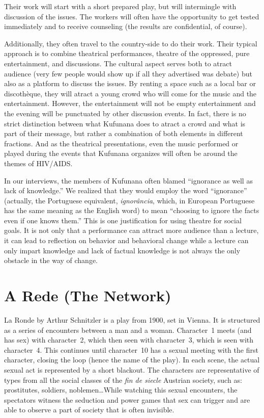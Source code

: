 \documentclass[article,twocolumn]{memoir}
\begin{document}
Their work will start with a short prepared play, but will intermingle with
discussion of the issues. The workers will often have the opportunity to get
tested immediately and to receive counseling (the results are confidential, of
course).

Additionally, they often travel to the country-side to do their work. Their
typical approach is to combine theatrical performances, theatre of the
oppressed, pure entertainment, and discussions. The cultural aspect serves both
to atract audience (very few people would show up if all they advertised was
debate) but also as a platform to discuss the issues. By renting a space such
as a local bar or discothèque, they will atract a young crowd who will come for
the music and the entertainment. However, the entertainment will not be empty
entertainment and the evening will be punctuated by other discussion events. In
fact, there is no strict distinction between what Kufunana does to atract a
crowd and what is part of their message, but rather a combination of both
elements in different fractions. And as the theatrical presentations, even the
music performed or played during the events that Kufunana organizes will often
be around the themes of HIV/AIDS.

In our interviews, the members of Kufunana often blamed ``ignorance as well as
lack of knowledge.'' We realized that they would employ the word ``ignorance''
(actually, the Portuguese equivalent, \textit{ignor\^{a}ncia}, which, in
European Portuguese has the same meaning as the English word) to mean
``choosing to ignore the facts even if one knows them.'' This is one
justification for using theatre for social goals. It is not only that a
performance can attract more audience than a lecture, it can lead to reflection
on behavior and behavioral change while a lecture can only impart knowledge and
lack of factual knowledge is not always the only obstacle in the way of change.

\chapter{A Rede (The Network)}
La Ronde by Arthur Schnitzler is a play from 1900, set in Vienna. It is
structured as a series of encounters between a man and a woman. Character~1
meets (and has sex) with character~2, which then seen with character~3, which
is seen with character~4. This continues until character~10 has a sexual
meeting with the first character, closing the loop (hence the name of the
play). In each scene, the actual sexual act is represented by a short blackout.
The characters are representative of types from all the social classes of the
\textit{fin de siecle} Austrian society, such as: prostitutes, soldiers,
noblemen\ldots While watching this sexual encounters, the spectators witness
the seduction and power games that sex can trigger and are able to observe a
part of society that is often invisible.
\end{document}
